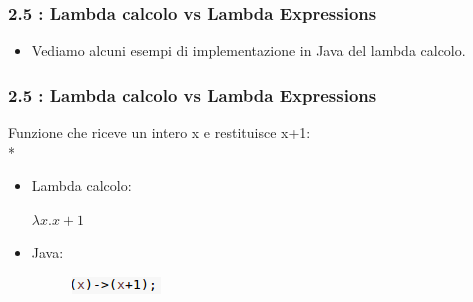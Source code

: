 \documentclass{beamer}
\begin{document}

\begin{frame}
\frametitle{\textbf{2.5 : Lambda calcolo vs Lambda Expressions}}
\begin{itemize}
	\item Vediamo alcuni esempi di implementazione in Java del lambda calcolo.
\end{itemize}
\end{frame}

\begin{frame}
\frametitle{\textbf{2.5 : Lambda calcolo vs Lambda Expressions}}
Funzione che riceve un intero x e restituisce x+1:\\*
\begin{itemize}
	\item Lambda calcolo:\begin{center} $\lambda x.x+1$ \end{center}
	\item Java:
	\begin{figure}
		\centering
		\includegraphics[width=0.3\linewidth]{identity}
	
		\label{fig:identity}
	\end{figure}
	
\end{itemize}
\end{frame}

\end{document}
